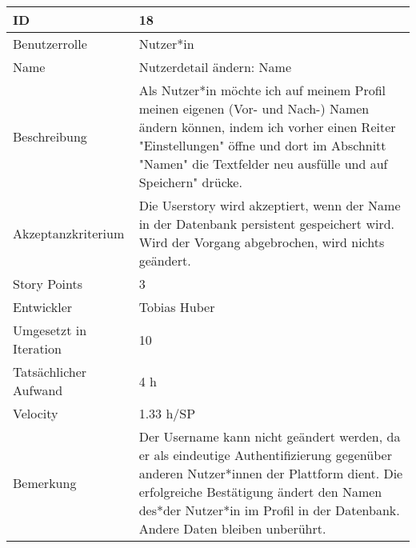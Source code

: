 \begin{tabularx}{\textwidth}{|p{}|X|}
	\hline
	ID & 18\\
	\hline
	Benutzerrolle & Nutzer*in\\
	\hline
	Name & Nutzerdetail ändern: Name\\
	\hline
	Beschreibung & Als Nutzer*in möchte ich auf meinem Profil meinen eigenen (Vor- und Nach-) Namen ändern können, indem ich vorher einen Reiter "Einstellungen" öffne und dort im Abschnitt "Namen" die Textfelder neu ausfülle und auf Speichern" drücke.\\
	\hline
	Akzeptanzkriterium & Die Userstory wird akzeptiert, wenn der Name in der Datenbank persistent gespeichert wird. Wird der Vorgang abgebrochen, wird nichts geändert.\\
	\hline
	Story Points & 3\\
	\hline
	Entwickler & Tobias Huber\\
	\hline
	Umgesetzt in Iteration & 10\\
	\hline
	Tatsächlicher Aufwand & 4 h\\
	\hline
	Velocity & 1.33 h/SP\\
	\hline
	Bemerkung & Der Username kann nicht geändert werden, da er als eindeutige Authentifizierung gegenüber anderen Nutzer*innen der Plattform dient. Die erfolgreiche Bestätigung ändert den Namen des*der Nutzer*in im Profil in der Datenbank. Andere Daten bleiben unberührt.\\
	\hline
\end{tabularx}
\vspace{20pt}
